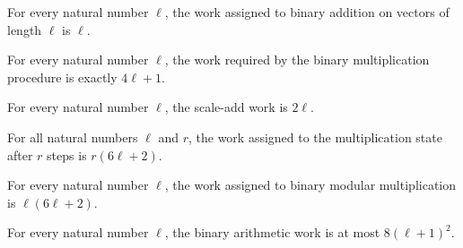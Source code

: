 \begin{theorem}
\label{FABL.binaryAddWork_eq}
\leanok
{}
For every natural number $\ell$, the work assigned to binary addition on vectors of
length $\ell$ is $\ell$.
\end{theorem}

\begin{theorem}
\label{FABL.binaryXMulModWork_eq}
\leanok
{}
For every natural number $\ell$, the work required by the binary multiplication
procedure is exactly $4\ell+1$.
\end{theorem}

\begin{theorem}
\label{FABL.binaryScaleAddWork_eq}
\leanok
{}
For every natural number $\ell$, the scale-add work is $2\ell$.
\end{theorem}

\begin{theorem}
\label{FABL.binaryMulModStateWork_eq}
\leanok
{}
For all natural numbers $\ell$ and $r$, the work assigned to the multiplication state
after $r$ steps is $r(6\ell+2)$.
\end{theorem}

\begin{theorem}
\label{FABL.binaryMulModWork_eq}
\leanok
{}
For every natural number $\ell$, the work assigned to binary modular multiplication is
$\ell(6\ell+2)$.
\end{theorem}

\begin{theorem}
\label{FABL.binaryArithmeticWork_le}
\leanok
{}
For every natural number $\ell$, the binary arithmetic work is at most $8(\ell+1)^2$.
\end{theorem}

